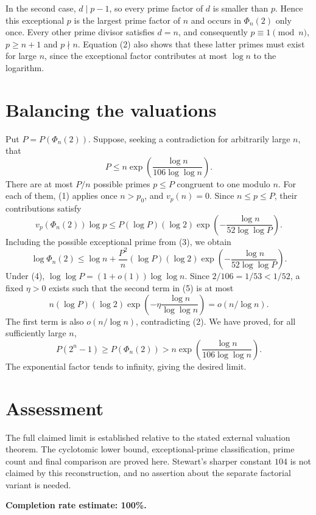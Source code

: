 \documentclass[11pt]{article}
\begin{document}
In the second case, $d\mid p-1$, so every prime factor of $d$ is smaller than $p$. Hence this exceptional $p$ is the largest prime factor of $n$ and occurs in $\Phi_n(2)$ only once. Every other prime divisor satisfies $d=n$, and consequently $p\equiv1\pmod n$, $p\ge n+1$ and $p\nmid n$. Equation (2) also shows that these latter primes must exist for large $n$, since the exceptional factor contributes at most $\log n$ to the logarithm.

\section*{Balancing the valuations}
Put $P=P(\Phi_n(2))$. Suppose, seeking a contradiction for arbitrarily large $n$, that
\[
 P\le n\exp\!\left(\frac{\log n}{106\log\log n}\right). \tag{4}
\]
There are at most $P/n$ possible primes $p\le P$ congruent to one modulo $n$. For each of them, (1) applies once $n>p_0$, and $v_p(n)=0$. Since $n\le p\le P$, their contributions satisfy
\[
 v_p(\Phi_n(2))\log p
 \le P(\log P)(\log2)
 \exp\!\left(-\frac{\log n}{52\log\log P}\right).
\]
Including the possible exceptional prime from (3), we obtain
\[
 \log\Phi_n(2)
 \le\log n+\frac{P^2}n(\log P)(\log2)
 \exp\!\left(-\frac{\log n}{52\log\log P}\right). \tag{5}
\]
Under (4), $\log\log P=(1+o(1))\log\log n$. Since $2/106=1/53<1/52$, a fixed $\eta>0$ exists such that the second term in (5) is at most
\[
 n(\log P)(\log2)\exp\!\left(-\eta\frac{\log n}{\log\log n}\right)
 =o(n/\log n).
\]
The first term is also $o(n/\log n)$, contradicting (2). We have proved, for all sufficiently large $n$,
\[
 P(2^n-1)\ge P(\Phi_n(2))>
 n\exp\!\left(\frac{\log n}{106\log\log n}\right).
\]
The exponential factor tends to infinity, giving the desired limit.

\section*{Assessment}
The full claimed limit is established relative to the stated external valuation theorem. The cyclotomic lower bound, exceptional-prime classification, prime count and final comparison are proved here. Stewart's sharper constant $104$ is not claimed by this reconstruction, and no assertion about the separate factorial variant is needed.

\textbf{Completion rate estimate: 100\%.}
\end{document}
